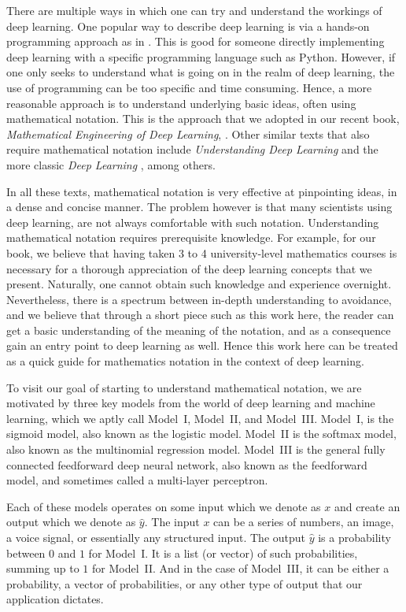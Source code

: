 \documentclass[12pt]{article}
\begin{document}
There are multiple ways in which one can try and understand the workings of deep learning. One popular way to describe deep learning is via a hands-on programming approach as in \cite{howard2020deep}. This is good for someone directly implementing deep learning with a specific programming language such as Python. However, if one only seeks to understand what is going on in the realm of deep learning, the use of programming can be too specific and time consuming. Hence, a more reasonable approach is to understand underlying basic ideas, often using mathematical notation. This is the approach that we adopted in our recent book, {\em Mathematical Engineering of Deep Learning}, \cite{LiquetMokaNazarathy2024DeepLearning}. Other similar texts that also require mathematical notation include {\em Understanding Deep Learning
} \cite{prince2023understanding} and the more classic {\em Deep Learning} \cite{goodfellow2016deep}, among others. 

In all these texts, mathematical notation is very effective at pinpointing ideas, in a dense and concise manner. The problem however is that many scientists using deep learning, are not always comfortable with such notation. Understanding mathematical notation requires prerequisite knowledge. For example, for our book, we believe that having taken 3 to 4 university-level mathematics courses is necessary for a thorough appreciation of the deep learning concepts that we present. Naturally, one cannot obtain such knowledge and experience overnight. Nevertheless, there is a spectrum between in-depth understanding to avoidance, and we believe that through a short piece such as this work here, the reader can get a basic understanding of the meaning of the notation, and as a consequence gain an entry point to deep learning as well. Hence this work here can be treated as a quick guide for mathematics notation in the context of deep learning.

To visit our goal of starting to understand mathematical notation, we are motivated by three key models from the world of deep learning and machine learning, which we aptly call Model~I, Model~II, and Model~III. Model~I, is the sigmoid model, also known as the logistic model. Model~II is the softmax model, also known as the multinomial regression model. Model~III is the general fully connected feedforward deep neural network, also known as the feedforward model, and sometimes called a multi-layer perceptron. 

Each of these models operates on some input which we denote as $x$ and create an output which we denote as $\hat{y}$. The input $x$ can be a series of numbers, an image, a voice signal, or essentially any structured input. The output $\hat{y}$ is a probability between $0$ and $1$ for Model~I. It is a list (or vector) of such probabilities, summing up to $1$ for Model~II. And in the case of Model~III, it can be either a probability, a vector of probabilities, or any other type of output that our application dictates. 
\end{document}
